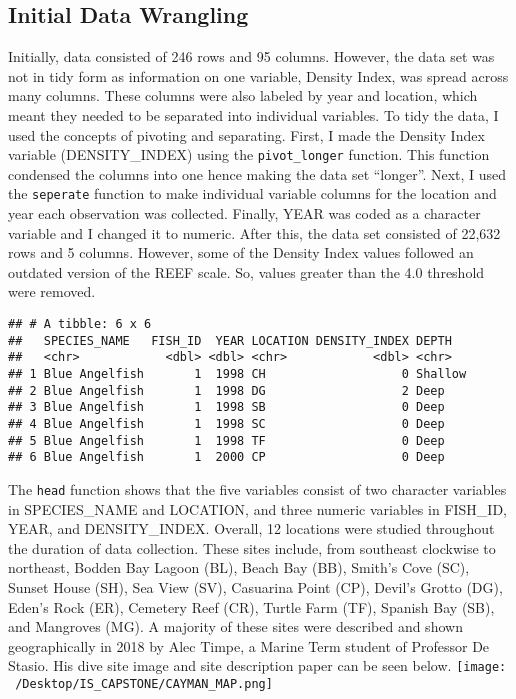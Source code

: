 \documentclass[
]{article}
\begin{document}
\hypertarget{initial-data-wrangling}{%
\subsection{Initial Data Wrangling}\label{initial-data-wrangling}}

Initially, data consisted of 246 rows and 95 columns. However, the data
set was not in tidy form as information on one variable, Density Index,
was spread across many columns. These columns were also labeled by year
and location, which meant they needed to be separated into individual
variables. To tidy the data, I used the concepts of pivoting and
separating. First, I made the Density Index variable (DENSITY\_INDEX)
using the \texttt{pivot\_longer} function. This function condensed the
columns into one hence making the data set ``longer''. Next, I used the
\texttt{seperate} function to make individual variable columns for the
location and year each observation was collected. Finally, YEAR was
coded as a character variable and I changed it to numeric. After this,
the data set consisted of 22,632 rows and 5 columns. However, some of
the Density Index values followed an outdated version of the REEF scale.
So, values greater than the 4.0 threshold were removed.

\begin{verbatim}
## # A tibble: 6 x 6
##   SPECIES_NAME   FISH_ID  YEAR LOCATION DENSITY_INDEX DEPTH  
##   <chr>            <dbl> <dbl> <chr>            <dbl> <chr>  
## 1 Blue Angelfish       1  1998 CH                   0 Shallow
## 2 Blue Angelfish       1  1998 DG                   2 Deep   
## 3 Blue Angelfish       1  1998 SB                   0 Deep   
## 4 Blue Angelfish       1  1998 SC                   0 Deep   
## 5 Blue Angelfish       1  1998 TF                   0 Deep   
## 6 Blue Angelfish       1  2000 CP                   0 Deep
\end{verbatim}

The \texttt{head} function shows that the five variables consist of two
character variables in SPECIES\_NAME and LOCATION, and three numeric
variables in FISH\_ID, YEAR, and DENSITY\_INDEX. Overall, 12 locations
were studied throughout the duration of data collection. These sites
include, from southeast clockwise to northeast, Bodden Bay Lagoon (BL),
Beach Bay (BB), Smith's Cove (SC), Sunset House (SH), Sea View (SV),
Casuarina Point (CP), Devil's Grotto (DG), Eden's Rock (ER), Cemetery
Reef (CR), Turtle Farm (TF), Spanish Bay (SB), and Mangroves (MG). A
majority of these sites were described and shown geographically in 2018
by Alec Timpe, a Marine Term student of Professor De Stasio. His dive
site image and site description paper can be seen below.
\texttt{[image: ~/Desktop/IS\_CAPSTONE/CAYMAN\_MAP.png]}
\end{document}
